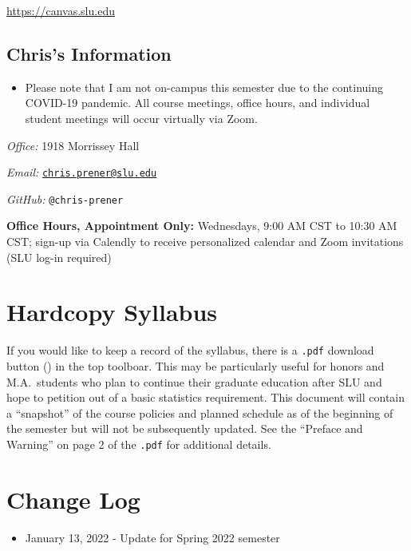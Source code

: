 \documentclass[
]{book}
\providecommand{\tightlist}{%
  \setlength{\itemsep}{0pt}\setlength{\parskip}{0pt}}
\newenvironment{rmdblock}[1]
  {\begin{shaded*}
  \begin{itemize}
  \renewcommand{\labelitemi}{
    \raisebox{-.7\height}[0pt][0pt]{
      {\setkeys{Gin}{width=3em,keepaspectratio}\texttt{[image: images/\#1]}}
    }
  }
  \item
  }
  {
  \end{itemize}
  \end{shaded*}
  }
\newenvironment{rmdwarning}
  {\begin{rmdblock}{warning}}
  {\end{rmdblock}}
\begin{document}
\url{https://canvas.slu.edu}

\hypertarget{chriss-information}{%
\subsection*{Chris's Information}\label{chriss-information}}

\begin{rmdwarning}
Please note that I am not on-campus this semester due to the continuing
COVID-19 pandemic. All course meetings, office hours, and individual
student meetings will occur virtually via Zoom.
\end{rmdwarning}

\emph{Office:} 1918 Morrissey Hall

\emph{Email:} \href{mailto:chris.prener@slu.edu}{\nolinkurl{chris.prener@slu.edu}}

\emph{GitHub:} \texttt{@chris-prener}

\textbf{Office Hours, Appointment Only:} Wednesdays, 9:00 AM CST to 10:30 AM CST; sign-up via Calendly to receive personalized calendar and Zoom invitations (SLU log-in required)

\hypertarget{hardcopy-syllabus}{%
\section*{Hardcopy Syllabus}\label{hardcopy-syllabus}}

If you would like to keep a record of the syllabus, there is a \texttt{.pdf} download button () in the top toolboar. This may be particularly useful for honors and M.A.~students who plan to continue their graduate education after SLU and hope to petition out of a basic statistics requirement. This document will contain a ``snapshot'' of the course policies and planned schedule as of the beginning of the semester but will not be subsequently updated. See the ``Preface and Warning'' on page 2 of the \texttt{.pdf} for additional details.

\hypertarget{change-log}{%
\section*{Change Log}\label{change-log}}

\begin{itemize}
\tightlist
\item
  January 13, 2022 - Update for Spring 2022 semester
\end{itemize}
\end{document}
